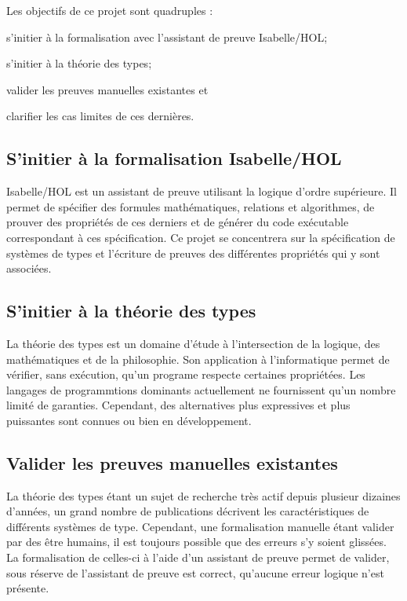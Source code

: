 \documentclass[a4paper, oneside, 12pt, titlepage, draft]{article}
\begin{document}

Les objectifs de ce projet sont quadruples :
\begin{enumerate*}[label=\arabic*)]
  \item s'initier à la formalisation avec l'assistant de preuve Isabelle/HOL;
  \item s'initier à la théorie des types;
  \item valider les preuves manuelles existantes et
  \item clarifier les cas limites de ces dernières.
\end{enumerate*}

\subsection{S'initier à la formalisation Isabelle/HOL}

Isabelle/HOL est un assistant de preuve utilisant la logique d'ordre supérieure. Il permet de
spécifier des formules mathématiques, relations et algorithmes, de prouver des propriétés de ces
derniers et de générer du code exécutable correspondant à ces spécification. Ce projet se
concentrera sur la spécification de systèmes de types et l'écriture de preuves des différentes
propriétés qui y sont associées.

\subsection{S'initier à la théorie des types}

La théorie des types est un domaine d'étude à l'intersection de la logique, des mathématiques et de
la philosophie. Son application à l'informatique permet de vérifier, sans exécution, qu'un programe
respecte certaines propriétées. Les langages de programmtions dominants actuellement ne fournissent
qu'un nombre limité de garanties. Cependant, des alternatives plus expressives et plus puissantes
sont connues ou bien en développement.

\subsection{Valider les preuves manuelles existantes}

La théorie des types étant un sujet de recherche très actif depuis plusieur dizaines d'années, un
grand nombre de publications décrivent les caractéristiques de différents systèmes de type.
Cependant, une formalisation manuelle étant valider par des être humains, il est toujours possible
que des erreurs s'y soient glissées. La formalisation de celles-ci à l'aide d'un assistant de preuve
permet de valider, sous réserve de l'assistant de preuve est correct, qu'aucune erreur logique n'est
présente.
\end{document}
